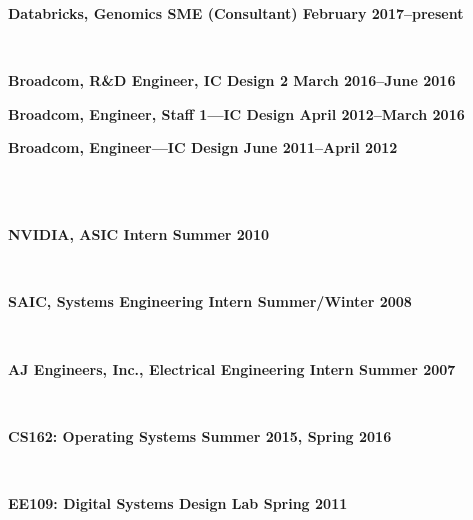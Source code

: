 \documentclass[10pt]{article} %
\begin{document}
\begin {minipage}[t]{0.2\linewidth}
\vspace{0pt}
\end {minipage}
\begin {minipage}[t]{0.8\linewidth}
\vspace{0pt}
\centerline {{\bf Databricks, Genomics SME (Consultant) \hfill February 2017--present}}
 \\

\centerline {{\bf Broadcom, R\&D Engineer, IC Design 2 \hfill March 2016--June 2016}}
\centerline {{\bf Broadcom, Engineer, Staff 1---IC Design \hfill April 2012--March 2016}}
\centerline {{\bf Broadcom, Engineer---IC Design \hfill June 2011--April 2012}}
 \\

 \\
\centerline {\bf NVIDIA, ASIC Intern \hfill Summer 2010}
 \\

\centerline {\bf SAIC, Systems Engineering Intern \hfill Summer/Winter 2008}
 \\

\centerline {\bf AJ Engineers, Inc., Electrical Engineering Intern \hfill Summer 2007}
 \\

\end {minipage}

\begin {minipage}[t]{0.2\linewidth}
\vspace{0pt}
\end {minipage}
\begin {minipage}[t]{0.8\linewidth}
\vspace{0pt}

\centerline {{\bf CS162: Operating Systems \hfill Summer 2015, Spring 2016}}
 \\

\centerline {{\bf EE109: Digital Systems Design Lab \hfill Spring 2011}}
 \\

\end {minipage}
\end{document}
